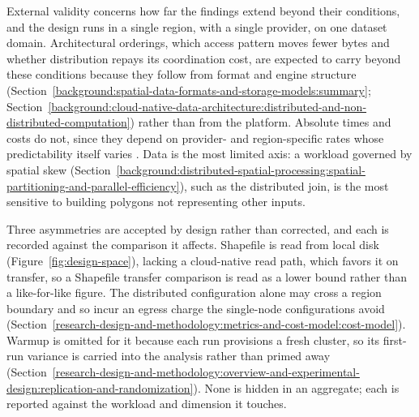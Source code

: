 External validity concerns how far the findings extend beyond their conditions, and the design runs in a single region, with a single provider, on one dataset domain. Architectural orderings, which access pattern moves fewer bytes and whether distribution repays its coordination cost, are expected to carry beyond these conditions because they follow from format and engine structure (Section~\ref{background:spatial-data-formats-and-storage-models:summary}; Section~\ref{background:cloud-native-data-architecture:distributed-and-non-distributed-computation}) rather than from the platform. Absolute times and costs do not, since they depend on provider- and region-specific rates whose predictability itself varies \parencite{leitner2016_patterns_chaos_iaas}. Data is the most limited axis: a workload governed by spatial skew (Section~\ref{background:distributed-spatial-processing:spatial-partitioning-and-parallel-efficiency}), such as the distributed join, is the most sensitive to building polygons not representing other inputs.

Three asymmetries are accepted by design rather than corrected, and each is recorded against the comparison it affects. Shapefile is read from local disk (Figure~\ref{fig:design-space}), lacking a cloud-native read path, which favors it on transfer, so a Shapefile transfer comparison is read as a lower bound rather than a like-for-like figure. The distributed configuration alone may cross a region boundary and so incur an egress charge the single-node configurations avoid (Section~\ref{research-design-and-methodology:metrics-and-cost-model:cost-model}). Warmup is omitted for it because each run provisions a fresh cluster, so its first-run variance is carried into the analysis rather than primed away (Section~\ref{research-design-and-methodology:overview-and-experimental-design:replication-and-randomization}). None is hidden in an aggregate; each is reported against the workload and dimension it touches.